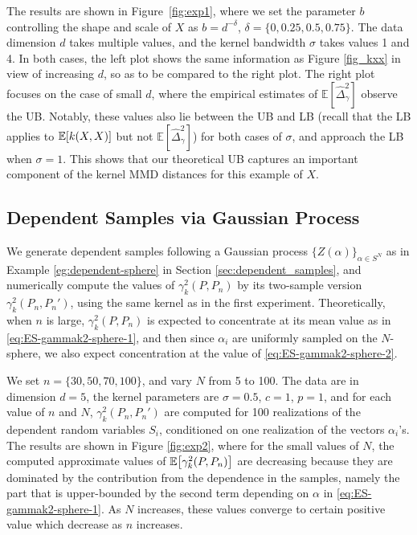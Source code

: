 \documentclass{article}
\theoremstyle{definition}
\newcommand{\ex}[1]{\ensuremath{\mathbb{E}\left[ #1\right]}}
\let\originalleft\left
\let\originalright\right
\renewcommand{\left}{\mathopen{}\mathclose\bgroup\originalleft}
\renewcommand{\right}{\aftergroup\egroup\originalright}
\begin{document}
The results are shown in Figure~\ref{fig:exp1}, where we set the parameter $b$ controlling the shape and scale of $X$ as $b = d^{-\delta}$, $\delta = \{ 0, 0.25, 0.5, 0.75 \}$.
The data dimension $d$ takes multiple values, and the kernel bandwidth $\sigma$ takes values 1 and 4. In both cases, the left plot shows the same information as Figure \ref{fig_kxx} in view of increasing $d$, so as to be compared to the right plot.  The right plot focuses on the case of small $d$, where the empirical estimates of $\mathbb{E} [\hat{\Delta}_\gamma^2]$ observe the UB.
Notably, these values also lie between the UB and LB (recall that the LB applies to $\ex{k(X,X)}$ but not $\mathbb{E}[ \hat{\Delta}_\gamma^2]$) for both cases of $\sigma$, and approach the LB when $\sigma=1$.
This shows that our theoretical UB captures an important component of the kernel MMD distances for this example of $X$.



\subsection{Dependent Samples via Gaussian Process}\label{sec:dependent_samples_example}

We generate dependent samples following a Gaussian process $\{ Z(\alpha)\}_{ \alpha \in S^N }$
as in Example \ref{eg:dependent-sphere} in Section \ref{sec:dependent_samples},
and numerically compute the values of $\gamma_k^2( P, P_n)$
by its two-sample version $\gamma_k^2( P_n,  {P}_n')$, using the same kernel as in the first experiment. 
Theoretically, when $n$ is large,
$\gamma_k^2(P, P_n)$ is expected to concentrate at its mean value as in \eqref{eq:ES-gammak2-sphere-1},
and then since $\alpha_i$ are uniformly sampled on the $N$-sphere,
we also expect concentration at the value of \eqref{eq:ES-gammak2-sphere-2}. 

We set $n=\{30, 50, 70, 100 \}$, and vary $N$ from 5 to 100.
The data are in dimension $d=5$, the kernel parameters are $\sigma = 0.5$, $c=1$, $p=1$, and  for each value of $n$ and $N$, $\gamma_k^2( P_n, P_n')$ are computed for 100 realizations of the dependent random variables $S_i$, conditioned on one realization of  the vectors $\alpha_i$'s. 
The results are shown in  Figure \ref{fig:exp2}, where for the small values of $N$, the computed approximate values of $\mathbb{E} \left[ \gamma_k^2(P, P_n)\right]$ are decreasing because they are dominated by the contribution from the dependence in the samples, namely the part that is upper-bounded by the second term depending on $\alpha$ in \eqref{eq:ES-gammak2-sphere-1}.
As $N$ increases, these values converge to certain positive value which decrease as $n$ increases. 
\end{document}
